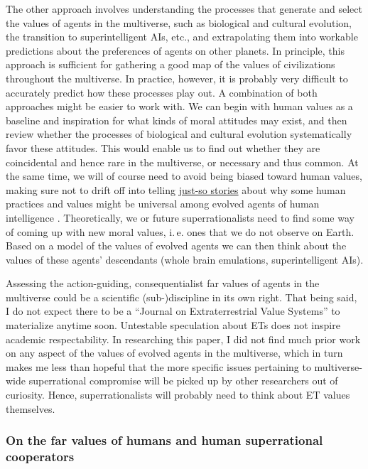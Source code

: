The other approach involves understanding the processes that generate
and select the values of agents in the multiverse, such as biological
and cultural evolution, the transition to superintelligent AIs, etc.,
and extrapolating them into workable predictions about the preferences
of agents on other planets. In principle, this approach is sufficient
for gathering a good map of the values of civilizations throughout the
multiverse. In practice, however, it is probably very difficult to
accurately predict how these processes play out. A combination of both
approaches might be easier to work with. We can begin with human values
as a baseline and inspiration for what kinds of moral attitudes may
exist, and then review whether the processes of biological and cultural
evolution systematically favor these attitudes. This would enable us to
find out whether they are coincidental and hence rare in the multiverse,
or necessary and thus common. At the same time, we will of course need
to avoid being biased toward human values, making sure not to drift off
into telling
\href{https://en.wikipedia.org/wiki/Just-so_story}{just-so
stories} about why some human practices and values might be universal
among evolved agents of human intelligence
\parencite{Buss2015-kp}. Theoretically, we or future
superrationalists need to find some way of coming up with new moral
values, i.\,e. ones that we do not observe on Earth. Based on a model of
the values of evolved agents we can then think about the values of these
agents' descendants (whole brain emulations, superintelligent AIs).

Assessing the action-guiding, consequentialist far values of agents in
the multiverse could be a scientific (sub-)discipline in its own right.
That being said, I do not expect there to be a ``Journal on
Extraterrestrial Value Systems'' to materialize anytime soon. Untestable
speculation about ETs does not inspire academic respectability. In
researching this paper, I did not find much prior work on any aspect of
the values of evolved agents in the multiverse, which in turn makes me
less than hopeful that the more specific issues pertaining to
multiverse-wide superrational compromise will be picked up by other
researchers out of curiosity. Hence, superrationalists will probably
need to think about ET values themselves.

\subsubsection{On the far values of humans and human superrational
cooperators}\label{on-the-far-values-of-humans-and-human-superrational-cooperators}

